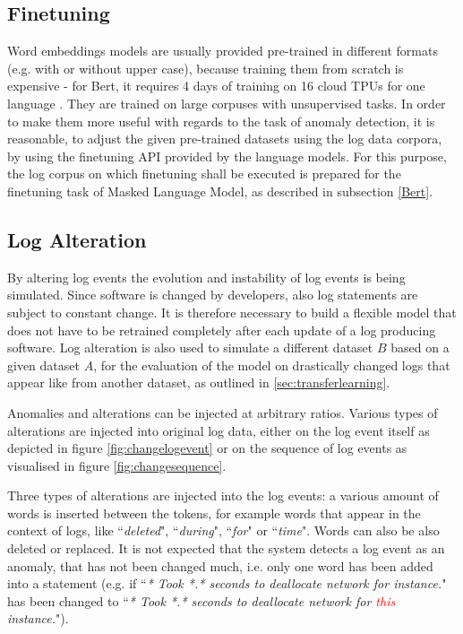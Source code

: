 \subsection{Finetuning\label{sec:finetuning}}
Word embeddings models are usually provided pre-trained in different formats (e.g. with or without upper case), because training them from scratch is expensive - for Bert, it requires 4 days of training on 16 cloud TPUs for one language \cite{googlebert}. They are trained on large corpuses with unsupervised tasks. In order to make them more useful with regards to the task of anomaly detection, it is reasonable, to adjust the given pre-trained datasets using the log data corpora, by using the finetuning API provided by the language models. For this purpose, the log corpus on which finetuning shall be executed is prepared for the finetuning task of Masked Language Model, as described in subsection \ref{Bert}.

\subsection{Log Alteration\label{sec:logs_alteration}}
By altering log events the evolution and instability of log events is being simulated. Since software is changed by developers, also log statements are subject to constant change. It is therefore necessary to build a flexible model that does not have to be retrained completely after each update of a log producing software. Log alteration is also used to simulate a different dataset $B$ based on a given dataset $A$, for the evaluation of the model on drastically changed logs that appear like from another dataset, as outlined in \ref{sec:transferlearning}.

Anomalies and alterations can be injected at arbitrary ratios. Various types of alterations are injected into original log data, either on the log event itself as depicted in figure \ref{fig:changelogevent} or on the sequence of log events as visualised in figure \ref{fig:changesequence}.

Three types of alterations are injected into the log events: a various amount of words is inserted between the tokens, for example words that appear in the context of logs, like ``\textit{deleted}", ``\textit{during}", ``\textit{for}" or ``\textit{time}". Words can also be also deleted or replaced. It is not expected that the system detects a log event as an anomaly, that has not been changed much, i.e. only one word has been added into a statement (e.g. if ``\textit{* Took *.* seconds to deallocate network for instance.}" has been changed to ``\textit{* Took *.* seconds to deallocate network for \textcolor{red}{this} instance.}").

